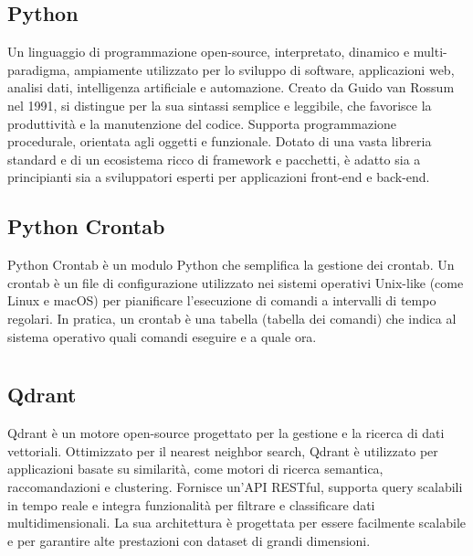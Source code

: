\hypertarget{sec:python}{}
\subsection*{Python}
Un linguaggio di programmazione open-source, interpretato, dinamico e multi-paradigma, ampiamente utilizzato per lo sviluppo di software, applicazioni web, 
analisi dati, intelligenza artificiale e automazione. Creato da Guido van Rossum nel 1991, si distingue per la sua sintassi semplice e leggibile, che 
favorisce la produttività e la manutenzione del codice. Supporta programmazione procedurale, orientata agli oggetti e funzionale. Dotato di una vasta 
libreria standard e di un ecosistema ricco di framework e pacchetti, è adatto sia a principianti sia a sviluppatori esperti per applicazioni front-end e 
back-end.

\hypertarget{sec:python_crontab}{}
\subsection*{Python Crontab}
Python Crontab è un modulo Python che semplifica la gestione dei crontab. Un crontab è un file di configurazione utilizzato nei 
sistemi operativi Unix-like (come Linux e macOS) per pianificare l'esecuzione di comandi a intervalli di tempo regolari. In pratica, 
un crontab è una tabella (tabella dei comandi) che indica al sistema operativo quali comandi eseguire e a quale ora.

\newpage



\section{}

\hypertarget{sec:qdrant}{}
\subsection*{Qdrant}
Qdrant è un motore open-source progettato per la gestione e la ricerca di dati vettoriali. Ottimizzato per il nearest neighbor search, Qdrant è utilizzato 
per applicazioni basate su similarità, come motori di ricerca semantica, raccomandazioni e clustering. Fornisce un'API RESTful, supporta query scalabili in 
tempo reale e integra funzionalità per filtrare e classificare dati multidimensionali. La sua architettura è progettata per essere facilmente scalabile e 
per garantire alte prestazioni con dataset di grandi dimensioni.

